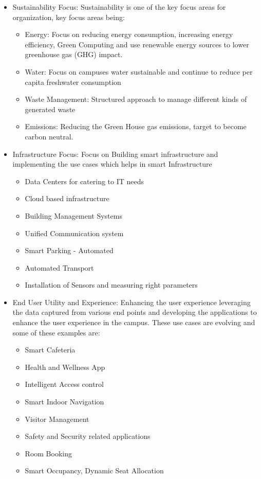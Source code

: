 \documentclass[conference]{IEEEtran}
\begin{document}
\begin{itemize}
\item Sustainability  Focus:  Sustainability  is  one  of  the  key  focus  areas for organization, key focus areas being:  
\begin{itemize}
            
  \item Energy:  Focus  on  reducing  energy  consumption,  increasing  energy  efficiency,  Green  Computing  and  use renewable energy sources to lower greenhouse gas (GHG) impact.  
  \item Water:    Focus  on  campuses  water  sustainable  and  continue to reduce per capita freshwater consumption 
  \item Waste Management: Structured approach to manage different kinds of  generated waste 
  \item Emissions: Reducing the Green House gas emissions, target to become carbon neutral.
\end{itemize} 
\item Infrastructure Focus: Focus on Building smart infrastructure and   implementing   the   use   cases   which   helps   in   smart   Infrastructure
  \begin{itemize}
  \item Data Centers for catering to IT needs 
  \item Cloud based infrastructure 
  \item Building Management Systems 
  \item Unified Communication system 
  \item Smart Parking - Automated 
  \item Automated Transport  
  \item Installation of Sensors and measuring right parameters
  \end{itemize}
  
 
  
\item End  User  Utility  and  Experience:    Enhancing  the  user  experience leveraging the data captured from various end points and developing the applications to enhance the user experience in the campus. These use cases are evolving and some of these examples are:
\begin{itemize}
  \item Smart Cafeteria 
  \item Health and Wellness App 
  \item Intelligent Access control  
  \item Smart Indoor Navigation 
  \item Visitor Management 
  \item Safety and Security related applications 
  \item Room Booking 
  \item Smart Occupancy, Dynamic Seat Allocation

\end{itemize}
\end{itemize}
\end{document}
